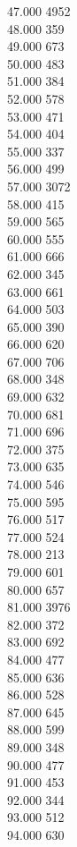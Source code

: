 { 47.000	4952 \\
 48.000	359 \\
 49.000	673 \\
 50.000	483 \\
 51.000	384 \\
 52.000	578 \\
 53.000	471 \\
 54.000	404 \\
 55.000	337 \\
 56.000	499 \\
 57.000	3072 \\
 58.000	415 \\
 59.000	565 \\
 60.000	555 \\
 61.000	666 \\
 62.000	345 \\
 63.000	661 \\
 64.000	503 \\
 65.000	390 \\
 66.000	620 \\
 67.000	706 \\
 68.000	348 \\
 69.000	632 \\
 70.000	681 \\
 71.000	696 \\
 72.000	375 \\
 73.000	635 \\
 74.000	546 \\
 75.000	595 \\
 76.000	517 \\
 77.000	524 \\
 78.000	213 \\
 79.000	601 \\
 80.000	657 \\
 81.000	3976 \\
 82.000	372 \\
 83.000	692 \\
 84.000	477 \\
 85.000	636 \\
 86.000	528 \\
 87.000	645 \\
 88.000	599 \\
 89.000	348 \\
 90.000	477 \\
 91.000	453 \\
 92.000	344 \\
 93.000	512 \\
 94.000	630 \\
}
